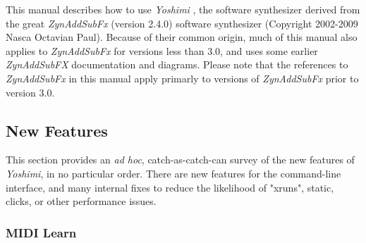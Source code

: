 \documentclass[
 11pt,
 twoside,
 a4paper,
 final                                 %
]{article}
\begin{document}
   This manual describes how to use \textsl{Yoshimi} \cite{yoshimi},
   the software synthesizer derived from the great
   \textsl{ZynAddSubFx} (version 2.4.0) \cite{zynaddsubfx} software
   synthesizer (Copyright 2002-2009 Nasca Octavian Paul).
   Because of their common origin, much of this manual also
   applies to \textsl{ZynAddSubFx} for versions less than 3.0,
   and uses some earlier \textsl{ZynAddSubFX} documentation and diagrams.
   Please note that the references to \textsl{ZynAddSubFx}
   in this manual apply primarly to versions of \textsl{ZynAddSubFx}
   prior to version 3.0.

%
%

\subsection{New Features}
\label{subsec:introduction_new_features}

   This section provides an \textsl{ad hoc}, catch-as-catch-can survey of the
   new features of \textsl{Yoshimi}, in no particular order.
   There are new features for the command-line interface, and many internal
   fixes to reduce the likelihood of "xruns", static, clicks, or other
   performance issues.

\subsubsection{MIDI Learn}
\label{subsubsec:new_features_midi_learn}
\end{document}
